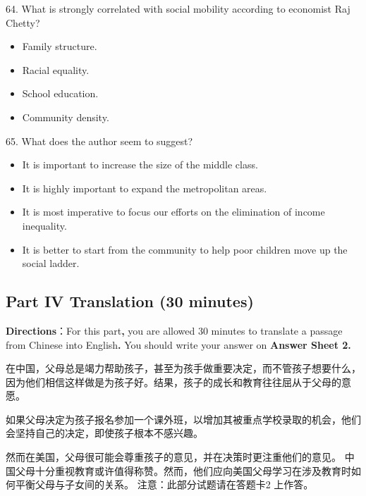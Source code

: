 \documentclass[UTF8,11pt]{ctexart}
\begin{document}
64. What is strongly correlated with social mobility according to economist Raj Chetty?


\begin{itemize}[leftmargin=2em,itemsep=.2em,topsep=.4em]\item[A.] Family structure.
\item[B.] Racial equality.
\item[C.] School education.
\item[D.] Community density.
\end{itemize}

65. What does the author seem to suggest?


\begin{itemize}[leftmargin=2em,itemsep=.2em,topsep=.4em]\item[A.] It is important to increase the size of the middle class.
\item[B.] It is highly important to expand the metropolitan areas.
\item[C.] It is most imperative to focus our efforts on the elimination of income inequality.
\item[D.] It is better to start from the community to help poor children move up the social ladder.
\end{itemize}

\subsection*{\textbf{Part} IV \textbf{Translation} \textbf{(30 minutes)}}


\textbf{Directions}：For this part\textbf{,} you are allowed 30 minutes to translate a passage from Chinese into English\textbf{.} You should write your answer on\textbf{ Answer Sheet 2.}


在中国，父母总是竭力帮助孩子，甚至为孩手做重要决定，而不管孩子想要什么，因为他们相信这样做是为孩子好。结果，孩子的成长和教育往往屈从于父母的意愿。


如果父母决定为孩子报名参加一个课外班，以增加其被重点学校录取的机会，他们会坚持自己的决定，即使孩子根本不感兴趣。


然而在美国，父母很可能会尊重孩子的意见，并在决策时更注重他们的意见。 中国父母十分重视教育或许值得称赞。然而，他们应向美国父母学习在涉及教育时如何平衡父母与子女间的关系。 注意：此部分试题请在答题卡2 上作答。
\end{document}
